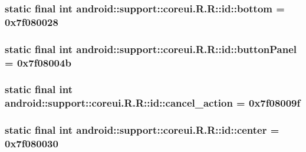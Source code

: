 \hypertarget{classandroid_1_1support_1_1coreui_1_1_r_1_1id_5824d42fcdfe94f648638f09759ae260}{
\subsubsection[{bottom}]{\setlength{\rightskip}{0pt plus 5cm}static final int android::support::coreui.R.R::id::bottom = 0x7f080028}}
\label{classandroid_1_1support_1_1coreui_1_1_r_1_1id_5824d42fcdfe94f648638f09759ae260}


\hypertarget{classandroid_1_1support_1_1coreui_1_1_r_1_1id_d5984480c0c752ccc21d7355631aed51}{
\subsubsection[{buttonPanel}]{\setlength{\rightskip}{0pt plus 5cm}static final int android::support::coreui.R.R::id::buttonPanel = 0x7f08004b}}
\label{classandroid_1_1support_1_1coreui_1_1_r_1_1id_d5984480c0c752ccc21d7355631aed51}


\hypertarget{classandroid_1_1support_1_1coreui_1_1_r_1_1id_0a0be4c3d4e923506a865c3307c180c4}{
\subsubsection[{cancel\_\-action}]{\setlength{\rightskip}{0pt plus 5cm}static final int android::support::coreui.R.R::id::cancel\_\-action = 0x7f08009f}}
\label{classandroid_1_1support_1_1coreui_1_1_r_1_1id_0a0be4c3d4e923506a865c3307c180c4}


\hypertarget{classandroid_1_1support_1_1coreui_1_1_r_1_1id_11a1a1b412cbc811257f62eeca7747f9}{
\subsubsection[{center}]{\setlength{\rightskip}{0pt plus 5cm}static final int android::support::coreui.R.R::id::center = 0x7f080030}}
\label{classandroid_1_1support_1_1coreui_1_1_r_1_1id_11a1a1b412cbc811257f62eeca7747f9}


